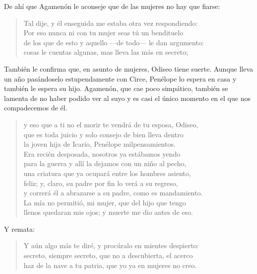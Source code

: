 De ahí que Agamenón le aconseje que de las mujeres no hay que fiarse:

\begin{verse}
Tal dije, y él enseguida me estaba otra vez respondiendo:\\
Por eso nunca ni con tu mujer seas tú un bendituelo\\
de los que de esto y aquello ---de todo--- le dan argumento:\\
cosas le cuentas algunas, mas lleva las más en secreto;
\end{verse}

También le confirma que, en asunto de mujeres, Odiseo tiene suerte. Aunque lleva un año pasándoselo estupendamente con Circe, Penélope lo espera en casa y también le espera su hijo. Agamenón, que cae poco simpático, también se lamenta de no haber podido ver al suyo y es casi el único momento en el que nos compadecemos de él.

\begin{verse}
y eso que a ti no el morir te vendrá de tu esposa, Odiseo,\\
que es toda juicio y solo consejo de bien lleva dentro\\
la joven hija de Icario, Penélope milpensamientos.\\
Era recién desposada, nosotros ya estábamos yendo\\
para la guerra y allí la dejamos con un niño al pecho,\\
una criatura que ya ocupará entre los hombres asiento,\\
feliz; y, claro, su padre por fin lo verá a su regreso,\\
y correrá él a abrazarse a su padre, como es mandamiento.\\
La mía no permitió, mi mujer, que del hijo que tengo\\
llenos quedaran mis ojos; y muerte me dio antes de eso.
\end{verse}

Y remata:

\begin{verse}
Y aún algo más te diré, y procúralo en mientes despierto:\\
secreto, siempre secreto, que no a descubierta, el acerco\\
haz de la nave a tu patria, que yo ya en mujeres no creo.
\end{verse}

